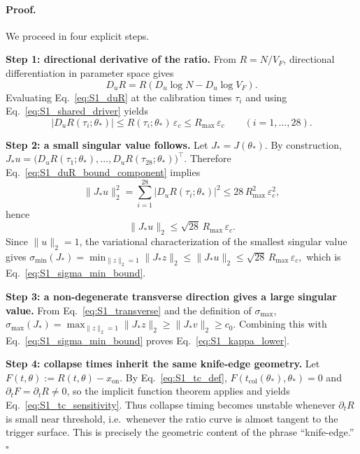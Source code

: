 \documentclass[11pt]{article}
\begin{document}
\paragraph{Proof.}
We proceed in four explicit steps.

\medskip
\noindent\textbf{Step 1: directional derivative of the ratio.}
From \(R=N/V_F\), directional differentiation in parameter space gives
\begin{equation}
D_u R=
R\left(D_u\log N-D_u\log V_F\right).
\label{eq:S1_duR}
\end{equation}
Evaluating Eq.~\eqref{eq:S1_duR} at the calibration times \(\tau_i\) and using
Eq.~\eqref{eq:S1_shared_driver} yields
\begin{equation}
|D_u R(\tau_i;\theta_*)|
\le
R(\tau_i;\theta_*)\,\varepsilon_c
\le
R_{\max}\,\varepsilon_c
\qquad
(i=1,\dots,28).
\label{eq:S1_duR_bound_component}
\end{equation}

\medskip
\noindent\textbf{Step 2: a small singular value follows.}
Let \(J_*=J(\theta_*)\). By construction,
$J_*u=
\bigl(D_u R(\tau_1;\theta_*),\dots,D_u R(\tau_{28};\theta_*)\bigr)^\top.$
Therefore Eq.~\eqref{eq:S1_duR_bound_component} implies
\begin{equation}
\|J_*u\|_2^2=
\sum_{i=1}^{28}|D_u R(\tau_i;\theta_*)|^2
\le
28\,R_{\max}^2\,\varepsilon_c^2,
\label{eq:S1_small_dir}
\end{equation}
hence
\begin{equation}
\|J_*u\|_2
\le
\sqrt{28}\,R_{\max}\,\varepsilon_c.
\label{eq:S1_small_dir2}
\end{equation}
Since \(\|u\|_2=1\), the variational characterization of the smallest singular value gives
$\sigma_{\min}(J_*)=
\min_{\|z\|_2=1}\|J_*z\|_2
\le
\|J_*u\|_2
\le
\sqrt{28}\,R_{\max}\,\varepsilon_c,$
which is Eq.~\eqref{eq:S1_sigma_min_bound}.

\medskip
\noindent\textbf{Step 3: a non-degenerate transverse direction gives a large singular value.}
From Eq.~\eqref{eq:S1_transverse} and the definition of \(\sigma_{\max}\),
$\sigma_{\max}(J_*)=
\max_{\|z\|_2=1}\|J_*z\|_2
\ge
\|J_*v\|_2
\ge
c_0.$
Combining this with Eq.~\eqref{eq:S1_sigma_min_bound} proves Eq.~\eqref{eq:S1_kappa_lower}.

\medskip
\noindent\textbf{Step 4: collapse times inherit the same knife-edge geometry.}
Let \(F(t,\theta):=R(t,\theta)-x_{\mathrm{on}}\). By Eq.~\eqref{eq:S1_tc_def},
\(F(t_{\mathrm{col}}(\theta_*),\theta_*)=0\) and \(\partial_tF=\partial_tR\neq 0\), so the implicit function theorem
applies and yields Eq.~\eqref{eq:S1_tc_sensitivity}. Thus collapse timing becomes unstable whenever
\(\partial_tR\) is small near threshold, i.e.\ whenever the ratio curve is almost tangent to the
trigger surface. This is precisely the geometric content of the phrase ``knife-edge.'' \hfill\(\square\)
\end{document}
